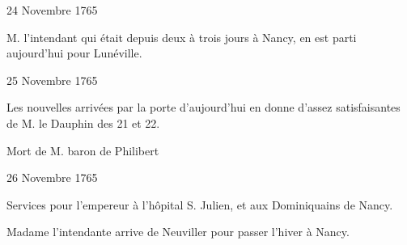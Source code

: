                      \begin{diary}{24 Novembre 1765}{}


                           M. l'intendant qui était
                           depuis deux à trois
                           jours à Nancy, en est parti
                           aujourd'hui pour Lunéville. \bigskip


                     \end{diary}

                     \begin{diary}{25 Novembre 1765}{}

                         Les nouvelles arrivées par la
                              porte d'aujourd'hui
                           en donne d'assez satisfaisantes de M. le
                              Dauphin
                           des 21 et 22. \bigskip


                         Mort de M.  baron de Philibert
                        \bigskip


                     \end{diary}

                     \begin{diary}{26 Novembre 1765}{}

                         Services pour l'empereur à l'hôpital S. Julien,
                           et aux Dominiquains de
                              Nancy. \bigskip



                           Madame l'intendante arrive de Neuviller pour
                           passer l'hiver à Nancy. \bigskip


                     \end{diary}

